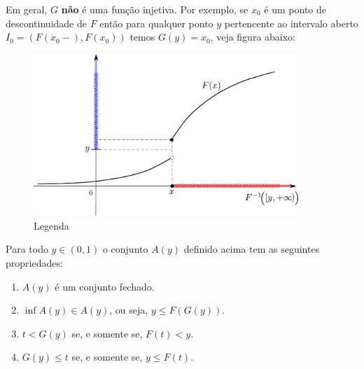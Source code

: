 \begin{observacao}
Em geral, $G$ {\bf não} é uma função injetiva. 
Por exemplo, se 
$x_0$ é um ponto de descontinuidade de $F$ então 
para qualquer ponto $y$ pertencente ao 
intervalo aberto $I_0=(F(x_0-),F(x_0))$ temos  
$G(y)=x_0$, veja figura abaixo:
\begin{center}
\begin{figure}[!htb]
\centering
\includegraphics[width=10cm]{Figuras/inversa-gen.pdf}
\caption{Legenda}
\label{Rotulo}
\end{figure}
\end{center}
\end{observacao}

\begin{proposicao}\label{prop-propriedades-G}
	Para todo $y\in (0,1)$ o conjunto $A(y)$ definido acima 
	tem as seguintes propriedades:
	\begin{enumerate}
		\item 
		$A(y)$ é um conjunto fechado.
		
		\item
		$\inf A(y) \in A(y)$, ou seja, $y\leq F(G(y))$.
		
		\item 
		$t<G(y)$ se, e somente se, $F(t)<y$.
		
		\item 
		$G(y)\leq t$ se, e somente se, $y\leq F(t)$.
	\end{enumerate}
\end{proposicao}



